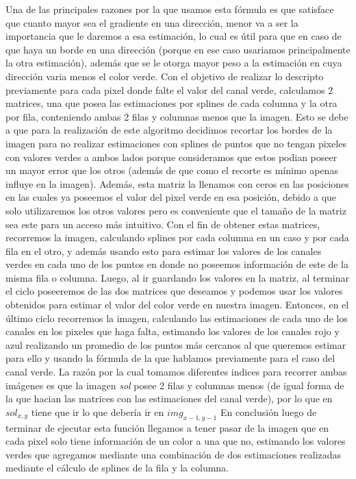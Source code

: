 \documentclass[10pt, a4paper]{article}
\begin{document}
Una de las principales razones por la que usamos esta f\'ormula es que satisface que cuanto mayor sea el gradiente en una direcci\'on, menor va a ser la importancia que le daremos a esa estimaci\'on, lo cual es \'util para que en caso de que haya un borde en una direcci\'on (porque en ese caso usariamos principalmente la otra estimaci\'on), adem\'as que se le otorga mayor peso a la estimaci\'on en cuya direcci\'on varia menos el color verde.
Con el objetivo de realizar lo descripto previamente para cada pixel donde falte el valor del canal verde, calculamos 2 matrices, una que posea las estimaciones por splines de cada columna y la otra por fila, conteniendo ambas 2 filas y columnas menos que la imagen. Esto se debe a que para la realizaci\'on de este algoritmo decidimos recortar los bordes de la imagen para no realizar estimaciones con splines de puntos que no tengan pixeles con valores verdes a ambos lados porque consideramos que estos podian poseer un mayor error que los otros (adem\'as de que como el recorte es m\'inimo apenas influye en la imagen). Adem\'as, esta matriz la llenamos con ceros en las posiciones en las cuales ya poseemos el valor del pixel verde en esa posici\'on, debido a que solo utilizaremos los otros valores pero es conveniente que el tamaño de la matriz sea este para un acceso m\'as intuitivo. Con el fin de obtener estas matrices, recorremos la imagen, calculando splines por cada columna en un caso y por cada fila en el otro, y adem\'as usando esto para estimar los valores de los canales verdes en cada uno de los puntos en donde no poseemos informaci\'on de este de la misma fila o columna. Luego, al ir guardando los valores en la matriz, al terminar el ciclo poseeremos de las dos matrices que deseamos y podemos usar los valores obtenidos para estimar el valor del color verde en nuestra imagen.
Entonces, en el \'ultimo ciclo recorremos la imagen, calculando las estimaciones de cada uno de los canales en los pixeles que haga falta, estimando los valores de los canales rojo y azul realizando un promedio de los puntos m\'as cercanos al que queremos estimar para ello y usando la f\'ormula de la que hablamos previamente para el caso del canal verde. La raz\'on por la cual tomamos diferentes indices para recorrer ambas im\'agenes es que la imagen \textit{sol} posee 2 filas y columnas menos (de igual forma de la que hacian las matrices con las estimaciones del canal verde), por lo que en $sol_{x,y}$ tiene que ir lo que deber\'ia ir en $img_{x-1, y-1}$
En conclusi\'on luego de terminar de ejecutar esta funci\'on llegamos a tener pasar de la imagen que en cada pixel solo tiene informaci\'on de un color a una que no, estimando los valores verdes que agregamos mediante una combinaci\'on de dos estimaciones realizadas mediante el c\'alculo de splines de la fila y la columna.
\end{document}
